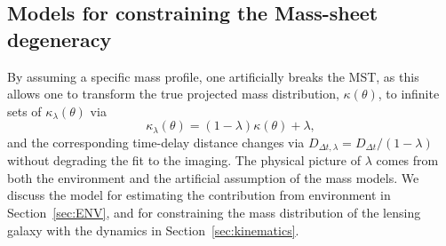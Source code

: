 \documentclass[useAMS,usenatbib]{mnras}
\newcommand\rxj{RXJ\,1131$-$1231}
\newcommand\he{HE\,0435$-$1223}
\newcommand\pg{PG\,1115$+$080}
\newcommand{\sref}[1]{Section~\ref{#1}}
\newcommand{\Ddt}{D_{\Delta t}}
\begin{document}




\subsection{Models for constraining the Mass-sheet degeneracy}
\label{subsec:lambda}
By assuming a specific mass profile, one artificially breaks the MST, as this
allows one to transform the true projected mass distribution, $\kappa(\theta)$, to infinite sets of $\kappa_{\lambda}(\theta)$ via 
\begin{equation}
\label{eq:MST}
    \kappa_{\lambda}(\theta)=(1-\lambda)\kappa(\theta)+\lambda,
\end{equation}
and the corresponding time-delay distance changes via $D_{\Delta t,\lambda}=\Ddt/(1-\lambda)$ without degrading the fit to the imaging. The physical picture of $\lambda$ comes from both the environment and the artificial assumption of the mass models. We discuss the model for estimating the contribution from environment in \sref{sec:ENV}, and for constraining the mass distribution of the lensing galaxy with the dynamics in \sref{sec:kinematics}.
\end{document}
